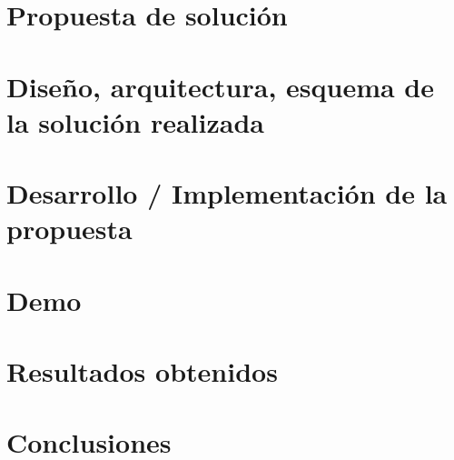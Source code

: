 \documentclass{beamer}
\begin{document}
  \section{Propuesta de solución}
  
  \section{Diseño, arquitectura, esquema de la solución realizada}
  
  \section{Desarrollo / Implementación de la propuesta}
  
  \section{Demo}
  
  \section{Resultados obtenidos}
  
  \section{Conclusiones} %
\end{document}
